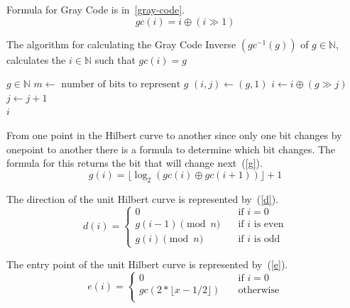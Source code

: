 \documentclass[10pt]{article}
\begin{document}
\flushleft
Formula for Gray Code is in~\ref{gray-code}.
\begin{equation}
  \label{gray-code}
  gc(i) = i \oplus \left( i \gg 1 \right) 
\end{equation}

\begin{algorithm}
  \caption{The algorithm for calculating the Gray Code Inverse $(gc^{-1}(g))$ of $g \in \mathbb{N}$, calculates the $i \in \mathbb{N}$ such that $gc\left( i \right) = g $ }
  \label{gray-code-inverse}
  \begin{algorithmic}[1]
    \Require $g \in \mathbb{N}$ 
    \State $ m \leftarrow \text{ number of bits to represent } g$ 
    \State $ \left( i, j \right) \leftarrow \left( g, 1 \right) $ 
    \State $ i \leftarrow i \oplus \left( g \gg j \right)$ 
    \State $ j \leftarrow j + 1$ 
    \EndWhile \\
    \Return $i$ %
  \end{algorithmic}
\end{algorithm}

From one point in the Hilbert curve to another since only one bit changes by onepoint to another there is a formula to determine which bit changes. The formula for this returns the bit that will change next~(\ref{g}).
\begin{equation}
  \label{g}
  g(i) = \lfloor \log _{2} \left( gc(i) \oplus gc(i+1) \right) \rfloor + 1
\end{equation}


The direction of the unit Hilbert curve is represented by~(\ref{d}).
\begin{equation}
  \label{d}
  d(i) = 
    \begin{cases}
      0 & \quad \text{if $i = 0$}\\
      g(i - 1) \pmod{n} & \quad \text{if $i$ is even} \\
      g(i) \pmod{n} & \quad \text{if $i$ is odd}
    \end{cases}
\end{equation}

The entry point of the unit Hilbert curve is represented by~(\ref{e}).
\begin{equation}
  \label{e}
  e(i) =  
    \begin{cases}
      0 & \quad \text{if $i = 0$}\\
      gc(2 * \lfloor x-1/2 \rfloor) & \quad \text{otherwise} \\
    \end{cases}
\end{equation}
\end{document}
